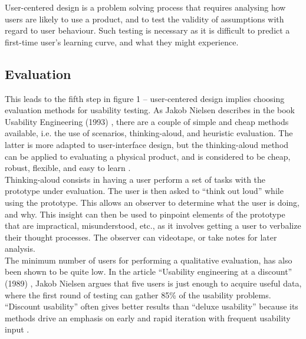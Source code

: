 User-centered design is a problem solving process that requires analysing how users are likely to use a product, and to test the validity of assumptions with regard to user behaviour. Such testing is necessary as it is difficult to predict a first-time user's learning curve, and what they might experience.

\subsection{Evaluation}
\label{section-evaluation}

This leads to the fifth step in figure 1 -- user-centered design implies choosing evaluation methods for usability testing. As Jakob Nielsen describes in the book Usability Engineering (1993) \cite{jakob-1993}, there are a couple of simple and cheap methods available, i.e. the use of scenarios, thinking-aloud, and heuristic evaluation. The latter is more adapted to user-interface design, but the thinking-aloud method can be applied to evaluating a physical product, and is considered to be cheap, robust, flexible, and easy to learn \cite{jakob-1993}. \\

Thinking-aloud consists in having a user perform a set of tasks with the prototype under evaluation. The user is then asked to ``think out loud'' while using the prototype. This allows an observer to determine what the user is doing, and why. This insight can then be used to pinpoint elements of the prototype that are impractical, misunderstood, etc., as it involves getting a user to verbalize their thought processes. The observer can videotape, or take notes for later analysis. \\

The minimum number of users for performing a qualitative evaluation, has also been shown to be quite low. In the article ``Usability engineering at a discount'' (1989) \cite{Nielsen-1989}, Jakob Nielsen argues that five users is just enough to acquire useful data, where the first round of testing can gather 85\% of the usability problems. ``Discount usability'' often gives better results than ``deluxe usability'' because its methods drive an emphasis on early and rapid iteration with frequent usability input \cite{nielsen-discount}.